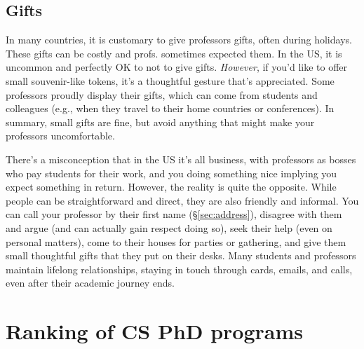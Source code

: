 \documentclass[oneside,11pt]{memoir}
\begin{document}
\section{Gifts} In many countries, it is customary to give professors gifts, often during holidays.  These gifts can be costly and profs. sometimes expected them. In the US, it is uncommon and perfectly OK to not to give gifts. \emph{However}, if you'd like to offer small souvenir-like tokens, it's a thoughtful gesture that's appreciated. Some professors proudly display their gifts, which can come from students and colleagues (e.g., when they travel to their home countries or conferences). In summary, small gifts are fine, but avoid anything that might make your professors uncomfortable.


There's a misconception that in the US it's all business, with professors as bosses who pay students for their work, and you doing something nice implying you expect something in return. However, the reality is quite the opposite. While people can be straightforward and direct, they are also friendly and informal. You can call your professor by their first name (\S\ref{sec:address}), disagree with them and argue (and can actually gain respect doing so), seek their help (even on personal matters), come to their houses for parties or gathering, and give them small thoughtful gifts that they put on their desks.  Many students and professors maintain lifelong relationships, staying in touch through cards, emails, and calls, even after their academic journey ends.%

\appendix

\chapter{Ranking of CS PhD programs}\label{sec:ranking}
  
\end{document}
